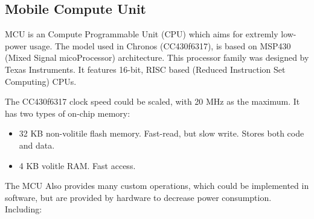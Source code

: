 \begin{commnet}
\subsection{Mobile Compute Unit}
MCU is an Compute Programmable Unit (CPU) which aims for extremly low-power usage.
The model used in Chronos (CC430f6317), is based on MSP430 (Mixed Signal micoProcessor) architecture.
This processor family was designed by Texas Instruments.
It features 16-bit, RISC based (Reduced Instruction Set Computing) CPUs.

The CC430f6317 clock speed could be scaled, with 20 MHz as the maximum. It has two types of on-chip memory:
\begin{itemize}
  \item 32 KB non-volitile flash memory. Fast-read, but slow write. Stores both code and data.
  \item 4 KB volitle RAM. Fast access. 
\end{itemize}

The MCU Also provides many custom operations, which could be implemented in software, but are provided by hardware to decrease power consumption. Including:


\end{commnet}
